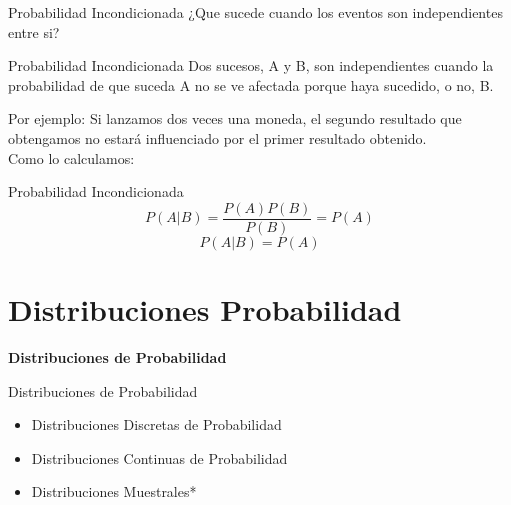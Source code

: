 \documentclass[11pt]{beamer}
\begin{document}
        \begin{frame}{Probabilidad Incondicionada}
          ¿Que sucede cuando los eventos son independientes entre si?\\
          \pause
          \begin{block}{Probabilidad Incondicionada}
                      Dos sucesos, A y B, son independientes cuando la probabilidad de que suceda A no se ve afectada porque haya sucedido, o no, B.
          \end{block}
          Por ejemplo: Si lanzamos dos veces una moneda, el segundo resultado que obtengamos no estará influenciado por el primer resultado obtenido.\\
          Como lo calculamos:
          \pause
          \begin{block}{Probabilidad Incondicionada}
            $$ P(A|B)=\dfrac{P(A)P(B)}{P(B)}=P(A)$$
            $$ P(A|B)=P(A)$$
          \end{block}
    \end{frame}


    \section*{Distribuciones Probabilidad}
      \begin{frame}{}
          \begin{center}
              \textbf{\huge Distribuciones de Probabilidad}
          \end{center}
      \end{frame}


      \begin{frame}{Distribuciones de Probabilidad}
          \begin{itemize}
              \item Distribuciones Discretas de Probabilidad
              \item Distribuciones Continuas de Probabilidad
              \item Distribuciones Muestrales*
          \end{itemize}
      \end{frame}
\end{document}
